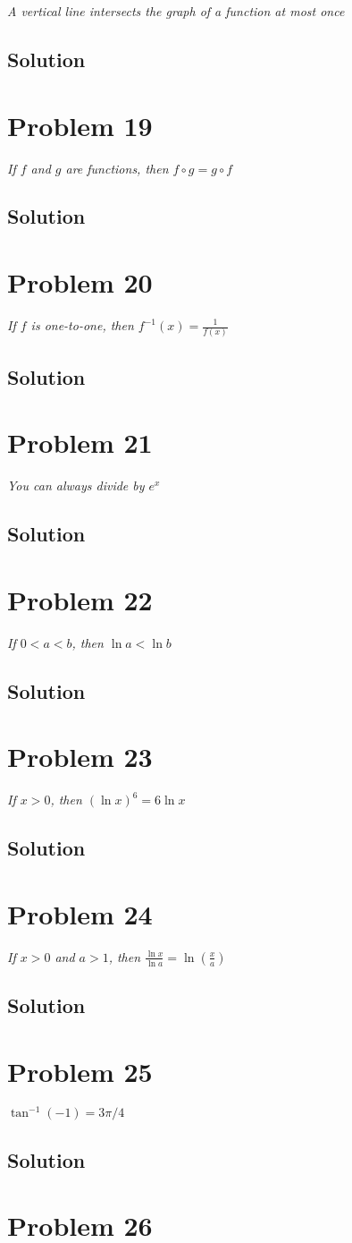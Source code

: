 \documentclass[11pt]{article}
\newcommand{\soln}{\subsection*}
\newcommand{\qn}{\textit}
\begin{document}
\qn{A vertical line intersects the graph of a function at most once}
\soln{Solution}

\section*{Problem 19}

\qn{If $f$ and $g$ are functions, then $f \circ g = g \circ f$}
\soln{Solution}

\section*{Problem 20}

\qn{If $f$ is one-to-one, then $f^{-1}(x)=\frac{1}{f(x)}$}
\soln{Solution}

\section*{Problem 21}

\qn{You can always divide by $e^x$}
\soln{Solution}

\section*{Problem 22}

\qn{If $0<a<b$, then $\ln{a}<\ln{b}$}
\soln{Solution}

\section*{Problem 23}

\qn{If $x>0$, then $(\ln{x})^6=6\ln{x}$}
\soln{Solution}

\section*{Problem 24}

\qn{If $x>0$ and $a>1$, then $\frac{\ln{x}}{\ln{a}}=\ln(\frac{x}{a})$}
\soln{Solution}

\section*{Problem 25}

\qn{$\tan^{-1}(-1)=3\pi/4$}
\soln{Solution}

\section*{Problem 26}
\end{document}
